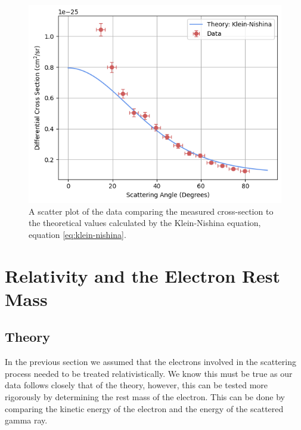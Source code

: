 \documentclass[%
reprint,
amsmath,amssymb,
aps,
]{revtex4-2}
\begin{document}
			\begin{figure}
				\includegraphics[width=0.85\columnwidth]{crossSectionPlot.png}
				\caption{\label{fig:crossSectionPlot}A scatter plot of the data comparing the measured cross-section to the theoretical values calculated by the Klein-Nishina equation, equation \ref{eq:klein-nishina}.}
			\end{figure}
		
	\section{Relativity and the Electron Rest Mass}	
		
		\subsection{Theory}
			In the previous section we assumed that the electrons involved in the scattering process needed to be treated relativistically. We know this must be true as our data follows closely that of the theory, however, this can be tested more rigorously by determining the rest mass of the electron. This can be done by comparing the kinetic energy of the electron and the energy of the scattered gamma ray.\\
\end{document}
